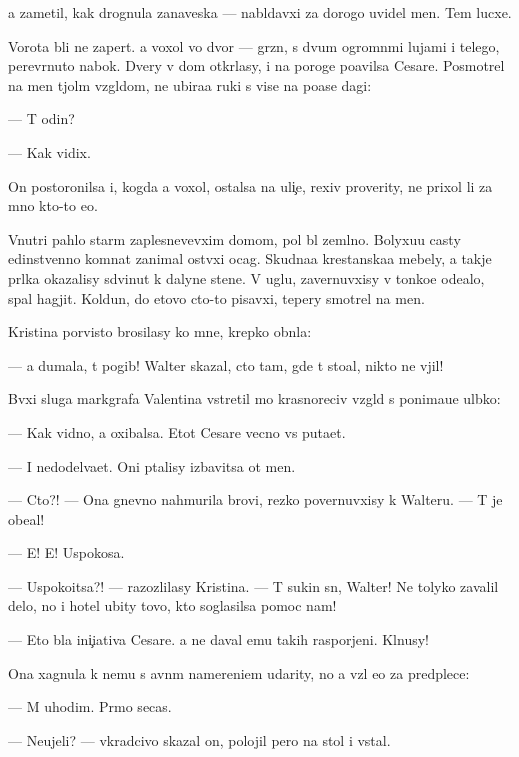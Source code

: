 \documentclass[10pt]{book}
\begin{document}
{\Y}a zametil, kak drognula zanaveska — nabl{\io}davxi{\y} za dorogo{\y} uvidel men{\ia}. Tem lucxe.

Vorota b{\yi}li ne zapert{\yi}. {\Y}a  voxol vo dvor — gr{\ia}zn{\yi}{\y}, s dvum{\ia} ogromn{\yi}mi lujami i telego{\y}, perev{\e}rnuto{\y} nabok. Dvery v dom otkr{\yi}lasy, i na poroge po{\y}avilsa Cesare. Posmotrel na men{\ia} t{\ia}jol{\yi}m vzgl{\ia}dom, ne ubira{\y}a ruki s vis{\ia}{\x}e{\y} na po{\y}ase dagi:

— T{\yi} odin?

— Kak vidix.

On postoronilsa i, kogda {\y}a  voxol, ostalsa na uli{\c}e, rexiv proverity, ne prixol li za mno{\y} kto-to {\y}e{\x}o.

Vnutri pahlo star{\yi}m zaplesnevevxim domom, pol b{\yi}l zeml{\ia}no{\y}. Bolyxu{\y}u casty {\y}edinstvenno{\y} komnat{\yi} zanimal ost{\yi}vxi{\y} ocag. Skudna{\y}a krest{\y}anska{\y}a mebely, a takje pr{\ia}lka okazalisy sdvinut{\yi} k dalyne{\y} stene. V uglu, zavernuvxisy v tonko{\y}e ode{\y}alo, spal hagjit. Koldun, do etovo cto-to pisavxi{\y}, tepery smotrel na men{\ia}.

Kristina por{\yi}visto brosilasy ko mne, krepko obn{\ia}la:

— {\Y}a dumala, t{\yi} pogib! Walter skazal, cto tam, gde t{\yi} sto{\y}al, nikto ne v{\yi}jil!

B{\yi}vxi{\y} sluga markgrafa Valentina vstretil mo{\y} krasnoreciv{\yi}{\y} vzgl{\ia}d s po\-ni\-ma\-{\y}u\-{\x}e{\y} ul{\yi}bko{\y}:

— Kak vidno, {\y}a oxibalsa. Etot Cesare vecno vs{\e} puta{\y}et.

— I nedodel{\yi}va{\y}et. Oni p{\yi}talisy izbavitsa ot men{\ia}.

— Cto?! — Ona gnevno nahmurila brovi, rezko povernuvxisy k Walteru. — T{\yi} je obe{\x}al!

— E{\y}! E{\y}! Uspoko{\y}sa.

— Uspoko{\y}itsa?! — razozlilasy Kristina. — T{\yi} sukin s{\yi}n, Walter! Ne tolyko zavalil delo, no i hotel ubity tovo, kto soglasilsa pomoc nam!

— Eto b{\yi}la ini{\c}iativa Cesare. {\Y}a ne daval {\y}emu takih raspor{\ia}jeni{\y}. Kl{\ia}nusy!

Ona xagnula k nemu s {\y}avn{\yi}m namereni{\y}em udarity, no {\y}a vz{\ia}l {\y}e{\y}o za predplec{\y}e:

— M{\yi} uhodim. Pr{\ia}mo se{\y}cas.

— Neujeli? — vkradcivo skazal on, polojil pero na stol i vstal.
\end{document}
